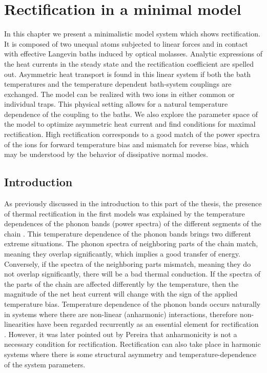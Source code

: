 
\chapter{Rectification in a minimal model}
\label{Chapter6}
%
In this chapter we present a minimalistic model system which shows rectification. It is composed of two unequal atoms subjected to linear forces and in contact with effective Langevin baths
induced by optical molasses. Analytic expressions of the heat currents in the steady state and the rectification coefficient are spelled out. Asymmetric heat transport is found in this linear system if both the bath temperatures and the temperature dependent bath-system couplings are exchanged. The model can be realized with two ions  in  either common or individual traps. This physical setting allows for a natural temperature dependence of the coupling to the baths.
We also explore the parameter space of the model to optimize asymmetric heat current and find
conditions for maximal rectification. High rectification corresponds to a good match of the power spectra of the ions for forward temperature bias and mismatch  for reverse bias, which may be understood by the behavior of dissipative normal modes.
%
\newpage
%
\section{Introduction \label{sec:Introduction}}

As previously discussed in the introduction to this part of the thesis, the presence of thermal rectification in the first models was explained by the temperature dependences of the phonon bands (power spectra) of the different segments of the chain \cite{Terraneo2002,Li2004}. This temperature dependence of the phonon bands brings two different extreme situations. The phonon spectra of neighboring parts of the chain match, meaning they overlap significantly, which implies a good transfer of energy. Conversely, if the spectra of the neighboring parts mismatch, meaning they do not overlap significantly, there will be a bad thermal conduction. If the spectra of the parts of the chain are affected differently by the temperature, then the magnitude of the net heat current will change with the sign of the applied temperature bias. Temperature dependence of the phonon bands occurs naturally in systems where there are non-linear (anharmonic) interactions, therefore non-linearities have been regarded recurrently as an essential element for rectification \cite{Li2012,Li2008,Hu2006,Zeng2008,Segal2005,Segal2005b,Katz2016,Benenti2016}. However, it was later pointed out by Pereira \cite{Pereira2017} that anharmonicity is not a necessary condition for rectification. Rectification can also take place in harmonic systems where there is some structural asymmetry and temperature-dependence of the system parameters.

